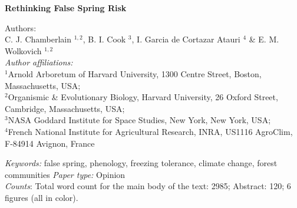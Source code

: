 \documentclass{article}\usepackage[]{graphicx}\usepackage[]{color}
\begin{document}
\noindent \textbf{\large{Rethinking False Spring Risk}}

\noindent Authors:\\
C. J. Chamberlain $^{1,2}$, B. I. Cook $^{3}$, I. Garcia de Cortazar Atauri $^{4}$ \& E. M. Wolkovich $^{1,2}$
\vspace{2ex}\\
\emph{Author affiliations:}\\
$^{1}$Arnold Arboretum of Harvard University, 1300 Centre Street, Boston, Massachusetts, USA; \\
$^{2}$Organismic \& Evolutionary Biology, Harvard University, 26 Oxford Street, Cambridge, Massachusetts, USA; \\
$^{3}$NASA Goddard Institute for Space Studies, New York, New York, USA; \\
$^{4}$French National Institute for Agricultural Research, INRA, US1116 AgroClim, F-84914 Avignon, France
\vspace{2ex}

\noindent \emph{Keywords:} false spring, phenology, freezing tolerance, climate change, forest communities
\emph{Paper type:} Opinion\\
 \emph{Counts}: Total word count for the main body of the text:  2985; Abstract: 120; 6 figures (all in color). \\

\renewcommand{\thetable}{\arabic{table}}
\renewcommand{\thefigure}{\arabic{figure}}
\renewcommand{\labelitemi}{$-$}

\end{document}
